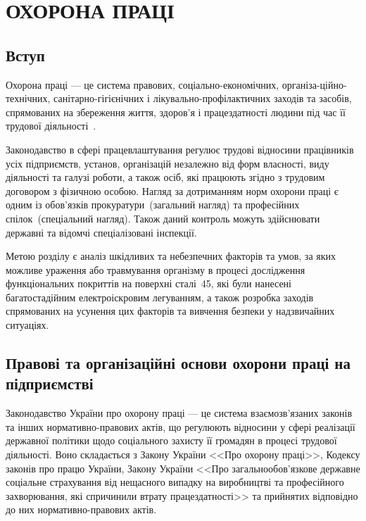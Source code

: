 \documentclass[a4paper,fontsize=14bp,ukrainian]{extreport}
\begin{document}
\chapter{ОХОРОНА ПРАЦІ}
\label{chap:work_safety}

\section{Вступ}

Охорона праці --- це система правових, соціально-економічних, організа-ційно-технічних, санітарно-гігієнічних і лікувально-профілактичних заходів та засобів, спрямованих на збереження життя, здоров'я і працездатності людини під час її трудової діяльності~\cite{tkachuk2006}.

Законодавство в сфері працевлаштування регулює трудові відносини працівників усіх підприємств, установ, організацій незалежно від форм власності, виду діяльності та галузі роботи, а також осіб, які працюють згідно з трудовим договором з фізичною особою. Нагляд за дотриманням норм охорони праці є одним із обов'язків прокуратури~(загальний нагляд) та професійних спілок~(спеціальний нагляд). Також даний контроль можуть здійснювати державні та відомчі спеціалізовані інспекції.~\cite{tkachuk2006}

Метою розділу є  аналіз шкідливих та небезпечних факторів та умов, за яких можливе ураження або травмування організму в процесі дослідження функціональних покриттів на поверхні сталі~45, які були нанесені багатостадійним електроіскровим легуванням, а також розробка заходів спрямованих на усунення цих факторів та вивчення безпеки у надзвичайних ситуаціях.

\section{Правові та організаційні основи охорони праці на підприємстві}

Законодавство України про охорону праці --- це система взаємозв’язаних законів та інших нормативно-правових актів, що регулюють відносини у сфері реалізації державної політики щодо соціального захисту її громадян в процесі трудової діяльності. Воно складається з Закону України <<Про охорону праці>>, Кодексу законів про працю України, Закону України <<Про загальнообов’язкове державне соціальне страхування від нещасного випадку на виробництві та професійного захворювання, які спричинили втрату працездатності>> та прийнятих відповідно до них нормативно-правових актів.~\cite{tkachuk2006}
\end{document}
